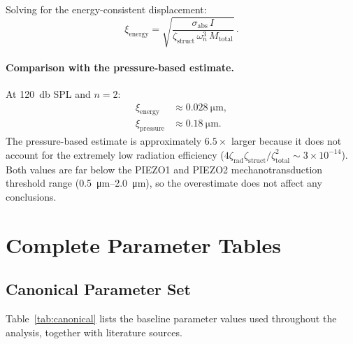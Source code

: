 \documentclass[12pt]{article}
\begin{document}
Solving for the energy-consistent displacement:
\begin{equation}
  \boxed{
    \xi_{\mathrm{energy}} = \sqrt{\frac{\sigma_{\mathrm{abs}}\,I}
      {\zeta_{\mathrm{struct}}\,\omega_{n}^{3}\,M_{\mathrm{total}}}}
  } \,.
  \tag{S17}
  \label{eq:xi_energy}
\end{equation}

\paragraph{Comparison with the pressure-based estimate.}
At \SI{120}{\decibel} SPL and $n=2$:
\begin{align*}
  \xi_{\mathrm{energy}} &\approx \SI{0.028}{\micro\metre}, \\
  \xi_{\mathrm{pressure}} &\approx \SI{0.18}{\micro\metre}.
\end{align*}
The pressure-based estimate is approximately $6.5\times$ larger because it
does not account for the extremely low radiation efficiency
($4\zeta_{\mathrm{rad}}\zeta_{\mathrm{struct}}/\zeta_{\mathrm{total}}^2 \sim 3 \times 10^{-14}$).  Both values
are far below the PIEZO1 and PIEZO2 mechanotransduction threshold range
(\SIrange{0.5}{2.0}{\micro\metre}), so the overestimate does not affect any
conclusions.


\section{Complete Parameter Tables}
\label{sec:tables}

\subsection{Canonical Parameter Set}
\label{sec:canonical_params}

Table~\ref{tab:canonical} lists the baseline parameter values used throughout
the analysis, together with literature sources.
\end{document}
